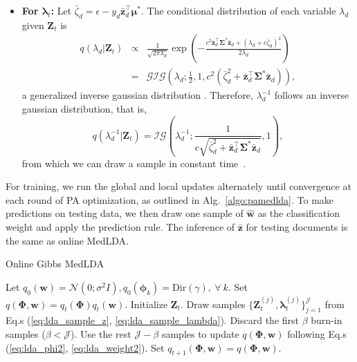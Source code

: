 \documentclass[twoside,11pt]{article}
\newcommand{\Zv}{\bm{Z}}
\newcommand{\wv}{\bm{w}}
\newcommand{\phiv}{\bm{\phi}}
\newcommand{\Phiv}{\bm{\Phi}}
\newcommand{\lambdav}{\bm \lambda}
\newcommand{\Sigmav}{\bm \Sigma}
\newcommand{\barzv}{\bm{\bar{z}}}
\begin{document}
\begin{enumerate}
\begin{itemize}
\item \textbf{For $\lambdav_t$:} Let $\bar{\zeta}_d = \epsilon-y_d \bar{\bm{z}}_d^\top \bm{\mu}^*$. The conditional distribution of each variable $\lambda_d$ given $\Zv_t$ is
%
\begin{eqnarray}\label{eq:lda_sample_lambda}
q(\lambda_d | \Zv_t) &\propto& \frac{1}{\sqrt{2 \pi \lambda_d}} \exp\left( - \frac{c^2 \bar{\bm{z}}_d^\top \Sigmav^* \bar{\bm{z}}_d + (\lambda_d+c \bar{\zeta}_d )^2}{2\lambda_d} \right) \nonumber \\
&=& \mathcal{GIG}\left( \lambda_d; \frac{1}{2}, 1, c^2 \left( \bar{\zeta}_d^2+\bar{\bm{z}}_d^\top\Sigmav^*\bar{\bm{z}}_d \right) \right),
\end{eqnarray}
%
a generalized inverse gaussian distribution \citep{devroye1986sample}. Therefore, $\lambda_d^{-1}$ follows an inverse gaussian distribution, that is, $$q(\lambda_d^{-1} | \bm{Z}_t) = \mathcal{IG}\left( \lambda_d^{-1}; \frac{1}{c\sqrt{\bar{\zeta}_d^2+\bar{\bm{z}}_d^\top\Sigmav^* \bar{\bm{z}}_d}}, 1\right),$$
from which we can draw a sample in constant time~\citep{Michael:IG76}.
\end{itemize}
\end{enumerate}

For training, we run the global and local updates alternately until convergence at each round of PA optimization, as outlined in Alg.~\ref{algo:pamedlda}. To make predictions on testing data, we then draw one sample of $\hat{\bm{w}}$ as the classification weight and apply the prediction rule. The inference of $\barzv$ for testing documents is the same as online MedLDA.


\begin{algorithm}[t]
\caption{\small{Online Gibbs MedLDA}}
\label{algo:pamedlda}
\begin{algorithmic}[1]
\STATE Let $q_0(\wv) = \mathcal{N}(0; \sigma^2 I), q_0(\phiv_k) = \text{Dir}(\gamma), ~\forall~ k$.
\STATE Set $q(\Phiv, \wv) = q_t(\Phiv) q_t(\wv)$. Initialize $\bm{Z}_t$.
\STATE Draw samples $\{\Zv_t^{(j)}, \lambdav_t^{(j)}\}_{j=1}^{\mathcal{J}}$ from  Eq.s (\ref{eq:lda_sample_z}, \ref{eq:lda_sample_lambda}).
\STATE Discard the first $\beta$ burn-in samples ($\beta < \mathcal{J}$).
\STATE Use the rest $\mathcal{J}-\beta$ samples to update $q(\Phiv, \wv)$ following Eq.s (\ref{eq:lda_phi2}, \ref{eq:lda_weight2}).
\ENDFOR
\STATE Set $q_{t+1}(\Phiv, \wv) = q(\Phiv, \wv)$.
\ENDFOR
\end{algorithmic}
\end{algorithm}
\end{document}
